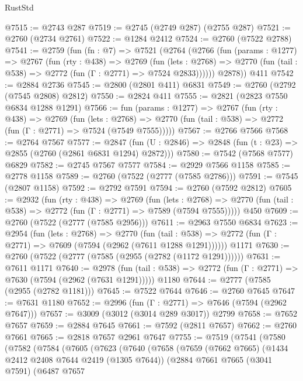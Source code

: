 \begin{lexlean}{RustStd}
\begin{coremodule}
@7515 := @2743 @287
@7519 := @2745 (@2749 @287) (@2755 @287)
@7521 := @2760 (@2734 @2761)
@7522 := @1284 @2412
@7524 := @2760 (@7522 @2788)
@7541 := @2759
    (fun (fn : @7) =>
    @7521
      (@2764
        (@2766
          (fun (params : @1277) =>
          @2767
            (fun (rty : @438) =>
            @2769
              (fun (lets : @2768) =>
              @2770 (fun (tail : @538) => @2772 (fun (Γ : @2771) => @7524 @2833))))))
        @2878))
    @411
@7542 := @2884 @2736
@7545 := @2800 (@2801 @411) @6831
@7549 := @2760 (@2792 (@7545 @2808) @2812)
@7550 := @2824 @411
@7555 := @2821 (@2823 @7550 @6834 @1288 @1291)
@7566 := fun (params : @1277) =>
  @2767
    (fun (rty : @438) =>
    @2769
      (fun (lets : @2768) =>
      @2770 (fun (tail : @538) => @2772 (fun (Γ : @2771) => @7524 (@7549 @7555)))))
@7567 := @2766 @7566
@7568 := @2764 @7567
@7577 := @2847 (fun (U : @2846) => @2848 (fun (t : @23) => @2855 (@2760 (@2861 @6831 @1294) @2872)))
@7580 := @7542 (@7568 @7577) @6829
@7582 := @2745 @7567 @7577
@7584 := @2929 @7566 @1158
@7585 := @2778 @1158
@7589 := @2760 (@7522 (@2777 (@7585 @2786)))
@7591 := @7545 (@2807 @1158)
@7592 := @2792 @7591
@7594 := @2760 (@7592 @2812)
@7605 := @2932
    (fun (rty : @438) =>
    @2769
      (fun (lets : @2768) =>
      @2770 (fun (tail : @538) => @2772 (fun (Γ : @2771) => @7589 (@7594 @7555)))))
    @450
@7609 := @2760 (@7522 (@2777 (@7585 @2956)))
@7611 := @2963 @7550 @6834
@7623 := @2954
    (fun (lets : @2768) =>
    @2770
      (fun (tail : @538) => @2772 (fun (Γ : @2771) => @7609 (@7594 (@2962 (@7611 @1288 @1291))))))
    @1171
@7630 := @2760 (@7522 (@2777 (@7585 (@2955 (@2782 (@1172 @1291))))))
@7631 := @7611 @1171
@7640 := @2978
    (fun (tail : @538) => @2772 (fun (Γ : @2771) => @7630 (@7594 (@2962 (@7631 @1291)))))
    @1180
@7644 := @2777 (@7585 (@2955 (@2782 @1181)))
@7645 := @7522 @7644
@7646 := @2760 @7645
@7647 := @7631 @1180
@7652 := @2996 (fun (Γ : @2771) => @7646 (@7594 (@2962 @7647)))
@7657 := @3009 (@3012 (@3014 @289 @3017)) @2799
@7658 := @7652 @7657
@7659 := @2884 @7645
@7661 := @7592 (@2811 @7657)
@7662 := @2760 @7661
@7665 := @2818 @7657 @2961 @7647
@7755 := @7519
    (@7541
      (@7580
        (@7582
          (@7584
            (@7605
              (@7623
                (@7640
                  (@7658
                    (@7659
                      (@7662 @7665)
                      (@1434 @2412 @2408 @7644 @2419 (@1305 @7644))
                      (@2884
                        @7661
                        @7665
                        (@3041 @7591)
                        (@6487
                          @7657

\end{coremodule}
\end{lexlean}
